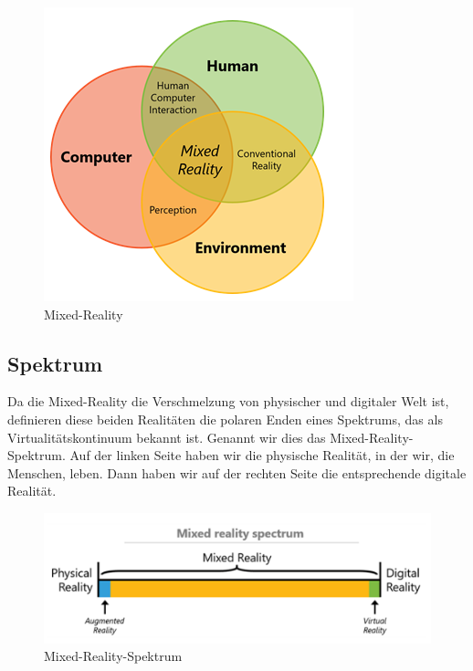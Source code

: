 \begin{figure}[ht]
	\centering
	\includegraphics[width=\textwidth,height=\textheight,keepaspectratio]{images/venndiagramm.png}
	\caption{Mixed-Reality}
	\label{Mixed-Reality4}
\end{figure}

\subsection{Spektrum}
Da die Mixed-Reality die Verschmelzung von physischer und digitaler Welt ist, definieren diese beiden Realitäten die polaren Enden eines Spektrums, das als Virtualitätskontinuum bekannt ist. Genannt wir dies das Mixed-Reality-Spektrum. Auf der linken Seite haben wir die physische Realität, in der wir, die Menschen, leben. Dann haben wir auf der rechten Seite die entsprechende digitale Realität.

\begin{figure}[ht]
	\centering
	\includegraphics[width=\textwidth,height=\textheight,keepaspectratio]{images/Mixed-Reality-Spektrum.png}
	\caption{Mixed-Reality-Spektrum}
	\label{Mixed-Reality3}
\end{figure}

